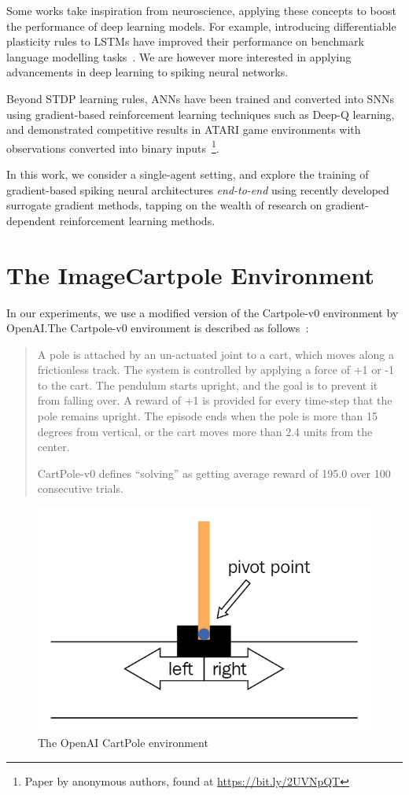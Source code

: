\documentclass[fyp]{socreport}
\begin{document}
Some works take inspiration from neuroscience, applying these concepts to boost
the performance of deep learning models. For example, introducing differentiable
plasticity rules to LSTMs have improved their performance on benchmark language
modelling tasks~\cite{miconi2018backpropamine}. We are however more interested
in applying advancements in deep learning to spiking neural networks.

Beyond STDP learning rules, ANNs have been trained and converted into SNNs using
gradient-based reinforcement learning techniques such as Deep-Q learning, and
demonstrated competitive results in ATARI game environments with observations
converted into binary inputs~\footnote{Paper by anonymous authors, found at
  \url{https://bit.ly/2UVNpQT}}.

In this work, we consider a single-agent setting, and explore the training of
gradient-based spiking neural architectures \emph{end-to-end} using recently
developed surrogate gradient methods, tapping on the wealth of research on
gradient-dependent reinforcement learning methods.

\section{The ImageCartpole Environment}

In our experiments, we use a modified version of the Cartpole-v0 environment by
OpenAI.\@ The Cartpole-v0 environment is described as follows~\cite{openai_gym}:

\begin{quote} A pole is attached by an un-actuated joint to a cart, which moves
along a frictionless track. The system is controlled by applying a force of +1
or -1 to the cart. The pendulum starts upright, and the goal is to prevent it
from falling over. A reward of +1 is provided for every time-step that the pole
remains upright. The episode ends when the pole is more than 15 degrees from
vertical, or the cart moves more than 2.4 units from the center.

CartPole-v0 defines ``solving'' as getting average reward of 195.0 over 100
consecutive trials.

\end{quote}

\begin{figure}[htbp] \centering
  \includegraphics[width=.55\linewidth]{images/openai_gym.png}
  \caption{The OpenAI CartPole environment}
\end{figure}
\end{document}
